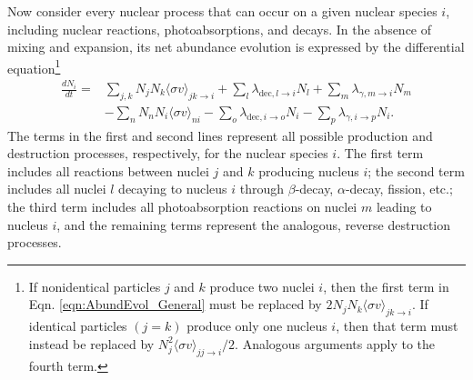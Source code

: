 Now consider every nuclear process that can occur on a given nuclear species $i$, including nuclear reactions, photoabsorptions, and decays. In the absence of mixing and expansion, its net abundance evolution is expressed by the differential equation\footnote{If nonidentical particles $j$ and $k$ produce two nuclei $i$, then the first term in Eqn. \ref{eqn:AbundEvol_General} must be replaced by $2N_{j}N_{k}\langle \sigma v \rangle_{jk \rightarrow i}$. If identical particles $(j = k)$ produce only one nucleus $i$, then that term must instead be replaced by $N_{j}^{2}\langle \sigma v \rangle_{jj \rightarrow i}/2$. Analogous arguments apply to the fourth term.}
\begin{align}
\frac{dN_{i}}{dt} = &\sum_{j,k} N_{j}N_{k} \langle \sigma v \rangle_{jk \rightarrow i} + \sum_{l} \lambda_{\mathrm{dec}, l \rightarrow i} N_{l} + \sum_{m} \lambda_{\gamma, m \rightarrow i} N_{m} \nonumber \\
&- \sum_{n} N_{n}N_{i}\langle \sigma v \rangle_{ni} - \sum_{o} \lambda_{\mathrm{dec}, i \rightarrow o} N_{i} - \sum_{p} \lambda_{\gamma, i \rightarrow p} N_{i}. \label{eqn:AbundEvol_General}
\end{align}
The terms in the first and second lines represent all possible production and destruction processes, respectively, for the nuclear species $i$. The first term includes all reactions between nuclei $j$ and $k$ producing nucleus $i$; the second term includes all nuclei $l$ decaying to nucleus $i$ through $\beta$-decay, $\alpha$-decay, fission, etc.; the third term includes all photoabsorption reactions on nuclei $m$ leading to nucleus $i$, and the remaining terms represent the analogous, reverse destruction processes.

